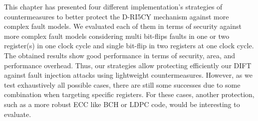 This chapter has presented four different implementation's strategies of countermeasures to better protect the D-RI5CY mechanism against more complex fault models. We evaluated each of them in terms of security against more complex fault models considering multi bit-flips faults in one or two register(s) in one clock cycle and single bit-flip in two registers at one clock cycle. The obtained results show good performance in terms of security, area, and performance overhead. Thus, our strategies allow protecting efficiently our DIFT against fault injection attacks using lightweight countermeasures. However, as we test exhaustively all possible cases, there are still some successes due to some combination when targeting specific registers. For these cases, another protection, such as a more robust ECC like BCH or LDPC code, would be interesting to evaluate.

